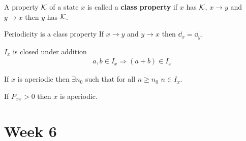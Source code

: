 \documentclass[12pt,a4paper]{article}
\begin{document}
\begin{defn}
A property $\cal K$ of a state $x$ is called a \textbf{class property} if 
$x$ has $\cal K$, $x\to y$ and $y\to x$ then $y$ has $\cal K$. 
\end{defn}

\begin{lemma}{Periodicity is a class property}
If $x\to y$ and $y\to x$ then $\dd_x = \dd_y$.
\end{lemma}

\begin{lemma}{$I_x$ is closed under addition}
\begin{align*}
a,b\in I_x \Rightarrow (a+b)\in I_x
\end{align*}
\end{lemma}

\begin{lemma}{}
If $x$ is aperiodic then $\exists n_0$ such that for all $n\geq n_0$ $n\in I_x$. 
\end{lemma}

\begin{lemma}{}
If $P_{xx} > 0$ then $x$ is aperiodic.
\end{lemma}
\newpage
\section{Week 6} 
\end{document}
